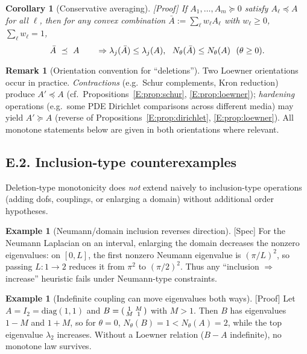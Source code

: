 \documentclass[11pt]{article}
\numberwithin{equation}{section}
\newtheorem{corollary}[theorem]{Corollary}
\theoremstyle{definition}
\newtheorem{example}[theorem]{Example}
\newtheorem{remark}[theorem]{Remark}
\providecommand{\n}{\unskip\space}
\begin{document}
\begin{corollary}[Conservative averaging]\label{E:cor:avg}
\textup{[Proof]}
If \(A_1,\dots,A_m\succeq 0\) satisfy \(A_\ell\preceq A\) for all \(\ell\), then for any convex combination \(\bar A:=\sum_\ell w_\ell A_\ell\) with \(w_\ell\ge 0\), \(\sum_\ell w_\ell=1\),
\[
\bar A\ \preceq\ A\qquad\Rightarrow\qquad\n\lambda_j(\bar A)\le \lambda_j(A),\ \ N_\theta(\bar A)\le N_\theta(A)\ \ (\theta\ge 0).
\]
\end{corollary}

\begin{remark}[Orientation convention for ``deletions'']
Two Loewner orientations occur in practice.
\emph{Contractions} (e.g.\ Schur complements, Kron reduction) produce \(A'\preceq A\) (cf.\ Propositions~\ref{E:prop:schur}, \ref{E:prop:loewner}); \emph{hardening} operations (e.g.\ some PDE Dirichlet comparisons across different media) may yield \(A'\succeq A\) (reverse of Propositions~\ref{E:prop:dirichlet}, \ref{E:prop:loewner}).
All monotone statements below are given in both orientations where relevant.
\end{remark}

\subsection*{E.2. Inclusion-type counterexamples}

Deletion-type monotonicity does \emph{not} extend naively to inclusion-type operations (adding dofs, couplings, or enlarging a domain) without additional order hypotheses.

\begin{example}[Neumann/domain inclusion reverses direction]\label{E:ex:neumann}
\textup{[Spec]}
For the Neumann Laplacian on an interval, enlarging the domain decreases the nonzero eigenvalues:
on \([0,L]\), the first nonzero Neumann eigenvalue is \((\pi/L)^2\), so passing \(L:1\to 2\) reduces it from \(\pi^2\) to \((\pi/2)^2\).
Thus any “inclusion \(\Rightarrow\) increase” heuristic fails under Neumann-type constraints.
\end{example}

\begin{example}[Indefinite coupling can move eigenvalues both ways]\label{E:ex:indef}
\textup{[Proof]}
Let \(A=I_2=\mathrm{diag}(1,1)\) and
\(B=\begin{psmallmatrix}1 & M\\ M & 1\end{psmallmatrix}\) with \(M>1\).
Then \(B\) has eigenvalues \(1-M\) and \(1+M\), so for \(\theta=0\),
\(N_\theta(B)=1<N_\theta(A)=2\), while the top eigenvalue \(\lambda_2\) increases.
Without a Loewner relation (\(B-A\) indefinite), no monotone law survives.
\end{example}
\end{document}
